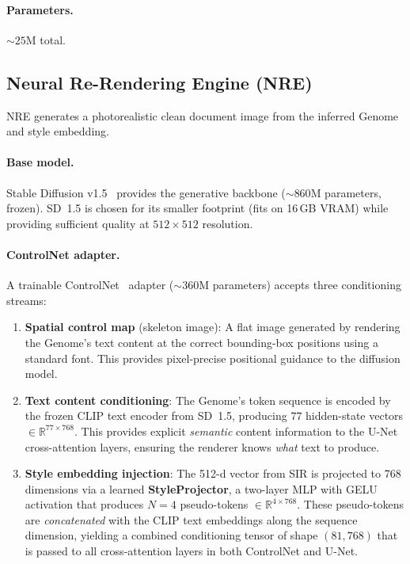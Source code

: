 \documentclass[conference]{IEEEtran}
\newcommand{\sir}{\textsc{SIR}}
\newcommand{\nre}{\textsc{NRE}}
\newcommand{\RR}{\mathbb{R}}
\begin{document}
\paragraph{Parameters.}  ${\sim}25$M total.

\subsection{Neural Re-Rendering Engine (\nre)}
\label{sec:nre}

\nre{} generates a photorealistic clean document image from the inferred Genome and
style embedding.

\paragraph{Base model.}
Stable Diffusion v1.5~\cite{rombach2022stablediffusion} provides the generative
backbone (${\sim}860$M parameters, frozen).  SD~1.5 is chosen for its smaller
footprint (fits on 16\,GB VRAM) while providing sufficient quality at
$512{\times}512$ resolution.

\paragraph{ControlNet adapter.}
A trainable ControlNet~\cite{zhang2023controlnet} adapter (${\sim}360$M parameters)
accepts three conditioning streams:

\begin{enumerate}[leftmargin=*,nosep]
\item \textbf{Spatial control map} (skeleton image):
  A flat image generated by rendering the Genome's text content at the correct
  bounding-box positions using a standard font.  This provides pixel-precise
  positional guidance to the diffusion model.
\item \textbf{Text content conditioning}:
  The Genome's token sequence is encoded by the frozen CLIP text encoder from
  SD~1.5, producing $77$ hidden-state vectors $\in \RR^{77 \times 768}$.
  This provides explicit \emph{semantic} content information to the U-Net
  cross-attention layers, ensuring the renderer knows \emph{what} text to produce.
\item \textbf{Style embedding injection}:
  The 512-d vector from \sir{} is projected to 768 dimensions via a learned
  \textbf{StyleProjector}, a two-layer MLP with GELU activation that produces
  $N{=}4$ pseudo-tokens $\in \RR^{4 \times 768}$.  These pseudo-tokens are
  \emph{concatenated} with the CLIP text embeddings along the sequence dimension,
  yielding a combined conditioning tensor of shape $(81, 768)$ that is passed to
  all cross-attention layers in both ControlNet and U-Net.
\end{enumerate}
\end{document}
